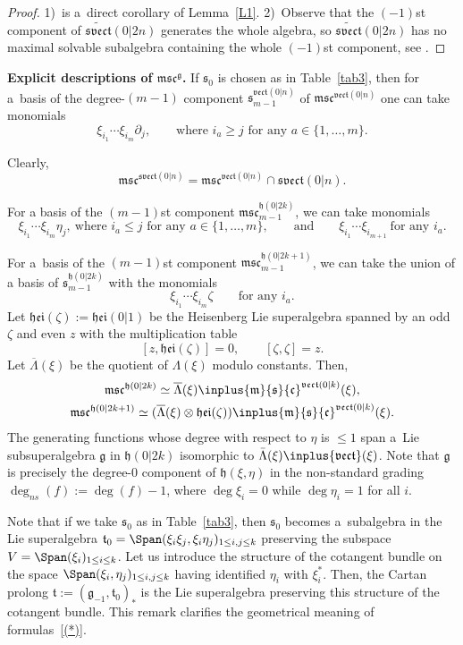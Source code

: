 \documentclass[pdftex]{sigma}
\newcommand{\del}{\partial}
\newcommand {\fc} {{\mathfrak{c}}}
\newcommand {\fg} {{\mathfrak{g}}} %
\newcommand {\fh} {{\mathfrak{h}}}
\newcommand {\fhei} {{\mathfrak{hei}}}
\newcommand {\fm} {{\mathfrak{m}}}
\newcommand {\fs} {{\mathfrak{s}}}
\newcommand {\fsvect} {{\mathfrak{svect}}}
\newcommand {\ft} {{\mathfrak{t}}}
\newcommand {\fvect} {{\mathfrak{vect}}} %
\newcommand {\<} [2] {{\left.\vphantom{#2}\right.^{#1\!}\!{#2}}}
\numberwithin{equation}{section}
\begin{document}
\begin{proof}
1)~is a~direct corollary of Lemma~\ref{L1}.
2)~Observe that the $(-1)$st component of $\widetilde{\fsvect}(0|2n)$ generates the whole algebra, so $\widetilde{\fsvect}(0|2n)$ has no maximal solvable subalgebra containing the whole $(-1)$st component, see \cite[Lemma~2.4]{BLM}.
\end{proof}

{\bf Explicit descriptions of $\boldsymbol{\fm\fs\fc^\fg}$.}
If $\fs_0$ is chosen as in Table~\ref{tab3}, then for a~basis of the degree-$(m-1)$ component $\fs_{m-1}^{\fvect(0|n)}$ of $\fm\fs\fc^{\fvect(0|n)}$ one can take monomials
\[
\xi_{i_1}\cdots\xi_{i_m}\del_j, \qquad \text{where $i_a\geq j$ for any $a\in\{1, \dots, m\}$}.
\]

Clearly,
\[
\fm\fs\fc^{\fsvect(0|n)}=\fm\fs\fc^{\fvect(0|n)}\cap\fsvect(0|n).
\]

For a basis of the $(m-1)$st component $\fm\fs\fc_{m-1}^{\fh(0|2k)}$, we can take monomials
\[
\xi_{i_1}\cdots\xi_{i_m}\eta_j, \  \text{where $i_a\leq j$ for any $a\in\{1, \dots, m\}$},  \qquad \text{and}\qquad
\xi_{i_1}\cdots\xi_{i_{m+1}} \  \text{for any $i_a$}.
\]

For a~basis of the $(m-1)$st component $\fm\fs\fc_{m-1}^{\fh(0|2k+1)}$, we can take the union of a basis of $\fs_{m-1}^{\fh(0|2k)}$ with the monomials
\[
\xi_{i_1}\cdots\xi_{i_m}\zeta\qquad \text{for any $i_a$}.
\]
Let $\fhei(\zeta):=\fhei(0|1)$ be the Heisenberg Lie superalgebra spanned by an odd $\zeta$ and even $z$ with the multiplication table
\[
[z, \fhei(\zeta)]=0,\qquad [\zeta, \zeta]=z.
\]
Let $\overline{\Lambda}(\xi)$ be the quotient of $\Lambda(\xi)$ modulo constants. Then,
\begin{gather}
\fm\fs\fc^{\fh(0|2k)}\simeq \overline{\Lambda}(\xi)\inplus\fm\fs\fc^{\fvect(0|k)}(\xi),\nonumber\\
\fm\fs\fc^{\fh(0|2k+1)}\simeq (\overline{\Lambda}(\xi)\otimes\fhei(\zeta))\inplus\fm\fs\fc^{\fvect(0|k)}(\xi).\label{(*)}
\end{gather}
The generating functions whose degree with respect to $\eta$ is $\leq 1$ span a~Lie subsuperalgebra $\fg$ in $\fh(0|2k)$ isomorphic to $\bar\Lambda(\xi)\inplus\fvect(\xi)$. Note that $\fg$ is precisely the degree-0 component of $\fh(\xi,\eta)$ in the non-standard grading $\deg_{ns} (f):=\deg (f)-1$, where $\deg \xi_i=0$ while $\deg \eta_i=1$ for all $i$.

Note that if we take $\fs_0$ as in Table~\ref{tab3}, then $\fs_0$ becomes a~subalgebra in the Lie superalgebra $\ft_0=\Span(\xi_i\xi_j, \xi_i\eta_j)_{1\leq i, j\leq k}$ preserving the subspace $V=\Span(\xi_i)_{1\leq i\leq k}$. Let us introduce the structure of the cotangent bundle on the space $\Span(\xi_i, \eta_j)_{1\leq i, j\leq k}$ having identified $\eta_i$ with $\xi_i^*$. Then, the Cartan prolong $\ft:=(\fg_{-1},\ft_0)_*$ is the Lie superalgebra preserving this structure of the cotangent bundle.
This remark clarifies the geometrical meaning of formulas~\eqref{(*)}.
\end{document}
